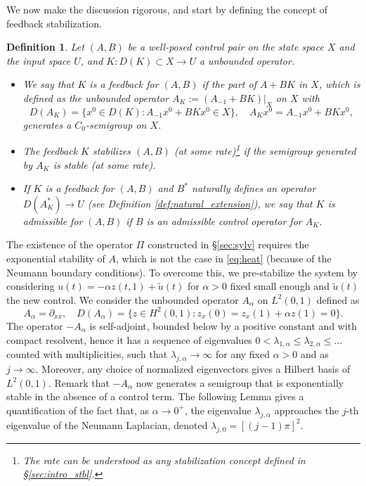 \documentclass[10pt]{article}
\newtheorem{Definition}[Theorem]{Definition}
\begin{document}
We now make the discussion rigorous, and start by defining the concept of feedback stabilization. 
\begin{Definition}\label{deff}
Let $(A,B)$ be a well-posed control pair on the state space $X$ and the input space $U$, and $K : D(K) \subset X \to U$ a unbounded operator. \begin{itemize}
    \item We say that $K$ is a feedback for $(A,B)$ if the part of $A+BK$ in $X$, which is defined as the unbounded operator $A_K := \left.( A_{-1} + BK )\right|_X$ on $X$ with 
\[
D(A_K) = \{ x^0 \in D(K) : A_{-1}x^0 + BKx^0 \in X \},\quad A_Kx^0 = A_{-1}x^0 + BKx^0,
\]
generates a $C_0$-semigroup on $X$. 
\item The feedback $K$ stabilizes $(A,B)$ (at some rate)\footnote{The rate can be understood as any stabilization concept defined in \S \ref{sec:intro_stbl}.} if the semigroup generated by $A_K$ is stable (at some rate). 
 \item If $K$ is a feedback for $(A,B)$ and $B^*$ naturally defines an operator $D(A_K^*) \to U$ (see Definition \ref{def:natural_extension}), we say that $K$ is admissible for $(A,B)$ if $B$ is an admissible control operator for $A_K$. 
\end{itemize}
\end{Definition}
The existence of the operator $\Pi$ constructed in \S \ref{sec:sylv} requires the exponential stability of $A$, which is not the case in \eqref{eq:heat} (because of the Neumann boundary conditions). To overcome this, we pre-stabilize the system by considering $u(t) = -\alpha z(t,1) + \tilde{u}(t)$ for $\alpha > 0$ fixed small enough and $\tilde{u}(t)$ the new control. We consider the unbounded operator $A_\alpha$ on $L^2(0,1)$ defined as 
\[
A_\alpha = \partial_{xx},\quad D(A_\alpha) = \{ z \in H^2(0,1) : z_x(0) = z_x(1) + \alpha z(1) = 0  \}.
\]
The operator $-A_\alpha$ is self-adjoint, bounded below by a positive constant and with compact resolvent, hence it has a sequence of eigenvalues $0<\lambda_{1,\alpha} \leq  \lambda_{2,\alpha} \leq ...$ counted with multiplicities, such that $\lambda_{j,\alpha} \to \infty$ for any fixed $\alpha > 0$ and as $j \to \infty$. Moreover, any choice of normalized eigenvectors gives a Hilbert basis of $L^2(0,1)$. Remark that $-A_\alpha$ now generates a semigroup that is exponentially stable in the absence of a control term. The following Lemma gives a quantification of the fact that, as $\alpha \to 0^+$, the eigenvalue $\lambda_{j,\alpha}$ approaches the $j$-th eigenvalue of the Neumann Laplacian, denoted $\lambda_{j,0} = [(j-1)\pi]^2$. 
\end{document}
